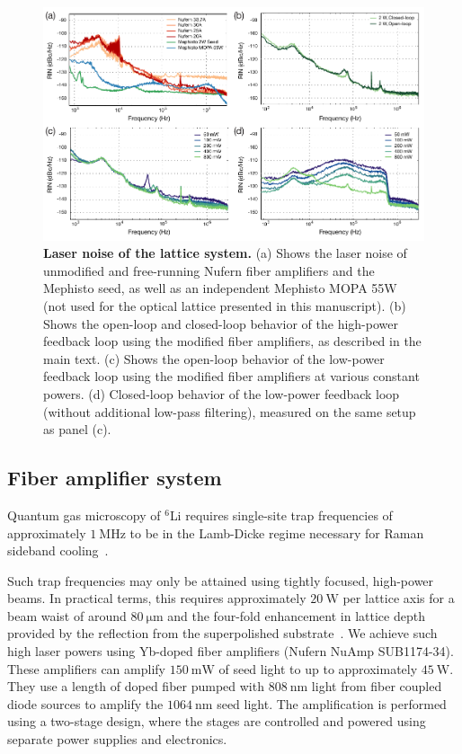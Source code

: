 \documentclass[twocolumn,aip,rsi,reprint,bibnotes]{revtex4-1}
\newcommand\unit[2]{\ensuremath{#1~\mathrm{{#2}}}}
\begin{document}
\begin{figure}
  \begin{center}
    \includegraphics{Figure2.pdf}
    \caption{\textbf{Laser noise of the lattice system.} (a) Shows the laser noise of unmodified and free-running Nufern fiber amplifiers and the Mephisto seed, as well as an independent Mephisto MOPA 55W (not used for the optical lattice presented in this manuscript). (b) Shows the open-loop and closed-loop behavior of the high-power feedback loop using the  modified fiber amplifiers, as described in the main text. (c) Shows the open-loop behavior of the low-power feedback loop using the modified fiber amplifiers at various constant powers. (d) Closed-loop behavior of the low-power feedback loop (without additional low-pass filtering), measured on the same setup as panel (c).}\label{fig:noises}
  \end{center}
\end{figure}

\subsection{Fiber amplifier system}
Quantum gas microscopy of $^6$Li requires single-site trap frequencies of approximately \unit{1}{MHz} to be in the Lamb-Dicke regime necessary for Raman sideband cooling~\cite{Parsons2015}.

Such trap frequencies may only be attained using tightly focused, high-power beams.
In practical terms, this requires approximately \unit{20}{W} per lattice axis for a beam waist of around \unit{80}{\mu m} and the four-fold enhancement in lattice depth provided by the reflection from the superpolished substrate~\cite{Huber2014}. We achieve such high laser powers using Yb-doped fiber amplifiers (Nufern NuAmp SUB1174-34).
These amplifiers can amplify \unit{150}{mW} of seed light to up to approximately \unit{45}{W}. They use a length of doped fiber pumped with \unit{808}{nm} light from fiber coupled diode sources to amplify the \unit{1064}{nm} seed light.
The amplification is performed using a two-stage design, where the stages are controlled and powered using separate power supplies and electronics.
\end{document}
